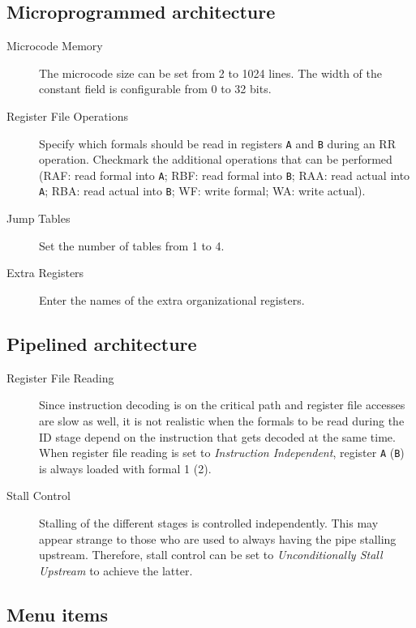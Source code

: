 \documentclass{article}
\begin{document}
\subsection{Microprogrammed architecture}

\begin{description}
\item[Microcode Memory] The microcode size can be set from 2 to 1024 lines. The width of the constant field is configurable from 0 to 32 bits.
\item[Register File Operations] Specify which formals should be read in registers \texttt{A} and \texttt{B} during an RR operation.
Checkmark the additional operations that can be performed (RAF: read formal into \texttt{A}; RBF: read formal into \texttt{B};
RAA: read actual into \texttt{A}; RBA: read actual into \texttt{B}; WF: write formal; WA: write actual).
\item[Jump Tables] Set the number of tables from 1 to 4.
\item[Extra Registers] Enter the names of the extra organizational registers. 
\end{description}

\subsection{Pipelined architecture}

\begin{description}
\item[Register File Reading] Since instruction
decoding is on the critical path and register file accesses are slow as well, it is not realistic when the formals to be
read during the ID stage depend on the instruction that gets decoded at the same time. When register file reading is set
to \emph{Instruction Independent}, register \texttt{A} (\texttt{B}) is always loaded with formal 1 (2).

\item[Stall Control] Stalling of the different
stages is controlled independently. This may appear strange to those who are used to always having the pipe stalling
upstream. Therefore, stall control can be set to \emph{Unconditionally Stall Upstream} to achieve the latter.
\end{description}

\subsection{Menu items}
\end{document}
